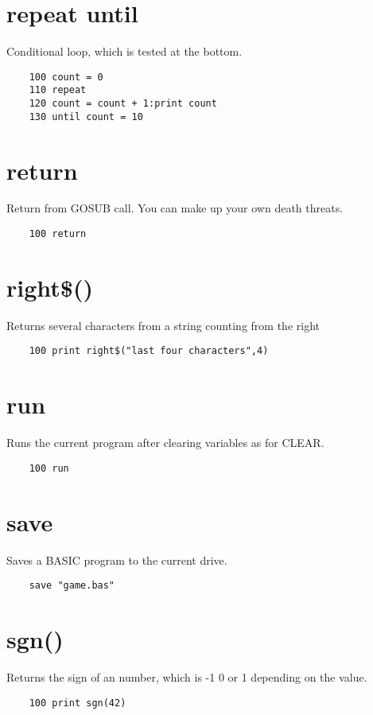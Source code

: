\section*{repeat until}
Conditional loop, which is tested at the bottom.
\example{}
\begin{verbatim}
	100 count = 0
	110 repeat
	120 count = count + 1:print count
	130 until count = 10
\end{verbatim}

\section*{return}
Return from GOSUB call. You can make up your own death threats.
\example{}
\begin{verbatim}
	100 return
\end{verbatim}

\section*{right\$()}
Returns several characters from a string counting from the right
\example{}
\begin{verbatim}
	100 print right$("last four characters",4)
\end{verbatim}

\section*{run}
Runs the current program after clearing variables as for CLEAR. 
\example{}
\begin{verbatim}
	100 run
\end{verbatim}

\section*{save}
Saves a BASIC program to the current drive.
\example{}
\begin{verbatim}
	save "game.bas"
\end{verbatim}

\section*{sgn()}
Returns the sign of an number, which is -1 0 or 1 depending on the value.
\example{}
\begin{verbatim}
	100 print sgn(42)
\end{verbatim}

